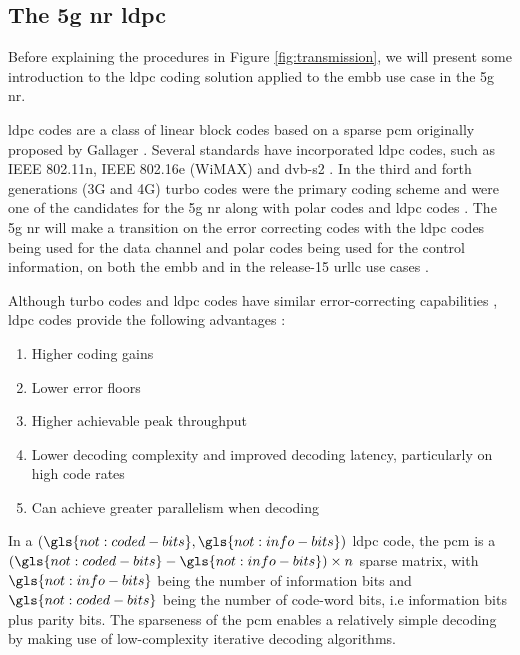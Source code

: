 

\subsection{The \gls{5g} \gls{nr} \gls{ldpc}}
\label{subsec:ldpc}

Before explaining the procedures in Figure \ref{fig:transmission}, we will present some introduction to the \gls{ldpc} coding solution applied to the \gls{embb} use case in the \gls{5g} \gls{nr}.
%

\Gls{ldpc} codes are a class of linear block codes based on a sparse \gls{pcm}  originally proposed by Gallager \cite{gallager1962}.
%
Several standards have incorporated \gls{ldpc} codes, such as IEEE 802.11n, IEEE 802.16e (WiMAX) and \gls{dvb-s2} \cite{AliZaidi632018}.
%
In the third and forth generations (3G and 4G) turbo codes were the primary coding scheme \cite{Richardson2018} and were one of the candidates for the \gls{5g} \gls{nr} along with polar codes and \gls{ldpc} codes \cite{Hamidi8417496}.
%
The \gls{5g} \gls{nr} will make a transition on the error correcting codes with the \gls{ldpc} codes being used for the data channel and polar codes being used for the control information, on both the \gls{embb} and in the release-15 \gls{urllc} use cases \cite{bae_abotabl_lin_song_lee_2019}.

Although turbo codes and \gls{ldpc} codes have similar error-correcting capabilities \cite{ErikDahlman5G}, \gls{ldpc} codes provide the following advantages \cite{Hui2018}:

\begin{enumerate}
    \item Higher coding gains
    \item Lower error floors
    \item Higher achievable peak throughput
    \item Lower decoding complexity and improved decoding latency, particularly on high code rates
    \item Can achieve greater parallelism when decoding
\end{enumerate}

In a $(\gls{not:coded-bits}, \gls{not:info-bits})$ \gls{ldpc} code, the \gls{pcm} is a $ (\gls{not:coded-bits}-\gls{not:info-bits}) \times n$ sparse matrix, with $\gls{not:info-bits}$ being the number of information bits and $\gls{not:coded-bits}$ being the number of code-word bits, i.e information bits plus parity bits.
%
The sparseness of the \gls{pcm} enables a relatively simple decoding by making use of low-complexity iterative decoding algorithms.


